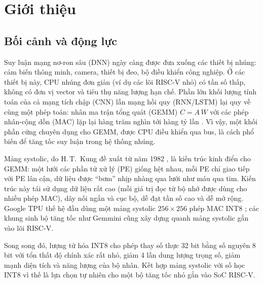 \chapter{Giới thiệu}
\label{ch:intro}

\section{Bối cảnh và động lực}
Suy luận mạng nơ-ron sâu (DNN) ngày càng được đưa xuống các thiết bị nhúng: cảm biến thông minh, camera, thiết bị đeo, bộ điều khiển công nghiệp. Ở các thiết bị này, CPU nhúng đơn giản (ví dụ các lõi RISC-V nhỏ) có tần số thấp, không có đơn vị vector và tiêu thụ năng lượng hạn chế. Phần lớn khối lượng tính toán của cả mạng tích chập (CNN) lẫn mạng hồi quy (RNN/LSTM) lại quy về cùng một phép toán: nhân ma trận tổng quát (GEMM) $C = A\,W$ với các phép nhân-cộng dồn (MAC) lặp lại hàng trăm nghìn tới hàng tỷ lần \cite{sze2017survey}. Vì vậy, một khối phần cứng chuyên dụng cho GEMM, được CPU điều khiển qua bus, là cách phổ biến để tăng tốc suy luận trong hệ thống nhúng.

Mảng systolic, do H.\,T.~Kung đề xuất từ năm 1982 \cite{kung1982}, là kiến trúc kinh điển cho GEMM: một lưới các phần tử xử lý (PE) giống hệt nhau, mỗi PE chỉ giao tiếp với PE lân cận, dữ liệu được ``bơm'' nhịp nhàng qua lưới như máu qua tim. Kiến trúc này tái sử dụng dữ liệu rất cao (mỗi giá trị đọc từ bộ nhớ được dùng cho nhiều phép MAC), dây nối ngắn và cục bộ, dễ đạt tần số cao và dễ mở rộng. Google TPU thế hệ đầu dùng một mảng systolic $256\times256$ phép MAC INT8 \cite{jouppi2017tpu}; các khung sinh bộ tăng tốc như Gemmini \cite{genc2021gemmini} cũng xây dựng quanh mảng systolic gắn vào lõi RISC-V.

Song song đó, lượng tử hóa INT8 \cite{jacob2018quant,krishnamoorthi2018} cho phép thay số thực 32 bit bằng số nguyên 8 bit với tổn thất độ chính xác rất nhỏ, giảm 4 lần dung lượng trọng số, giảm mạnh diện tích và năng lượng của bộ nhân. Kết hợp mảng systolic với số học INT8 vì thế là lựa chọn tự nhiên cho một bộ tăng tốc nhỏ gắn vào SoC RISC-V.

